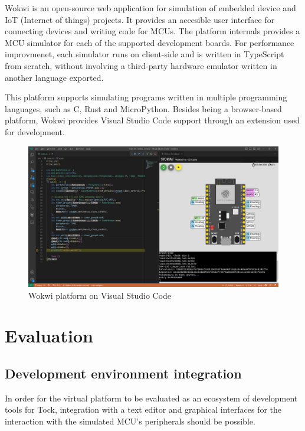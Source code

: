 \documentclass[12pt,a4paper]{report}
\begin{document}
Wokwi is an open-source web application for simulation of embedded device and IoT (Internet of things) projects. It provides an accesible user interface for connecting devices and writing code for MCUs. The platform internals provides a MCU simulator for each of the supported development boards. For performance improvmenet, each simulator runs on client-side and is written in TypeScript from scratch, without involving a third-party hardware emulator written in another language exported.

This platform supports simulating programs written in multiple programming languages, such as C, Rust and MicroPython. Besides being a browser-based platform, Wokwi provides Visual Studio Code support through an extension used for development.

\begin{figure}[H]
\centering
\includegraphics[scale=0.20]{pics/wokwi-vscode.png}
  \caption[Wokwi platform on Visual Studio Code]{Wokwi platform on Visual Studio Code}
  \label{fig:platform}
\end{figure}

\chapter{Evaluation}

\section{Development environment integration}

In order for the virtual platform to be evaluated as an ecosystem of development tools for Tock, integration with a text editor and graphical interfaces for the interaction with the simulated MCU's peripherals should be possible.
\end{document}

